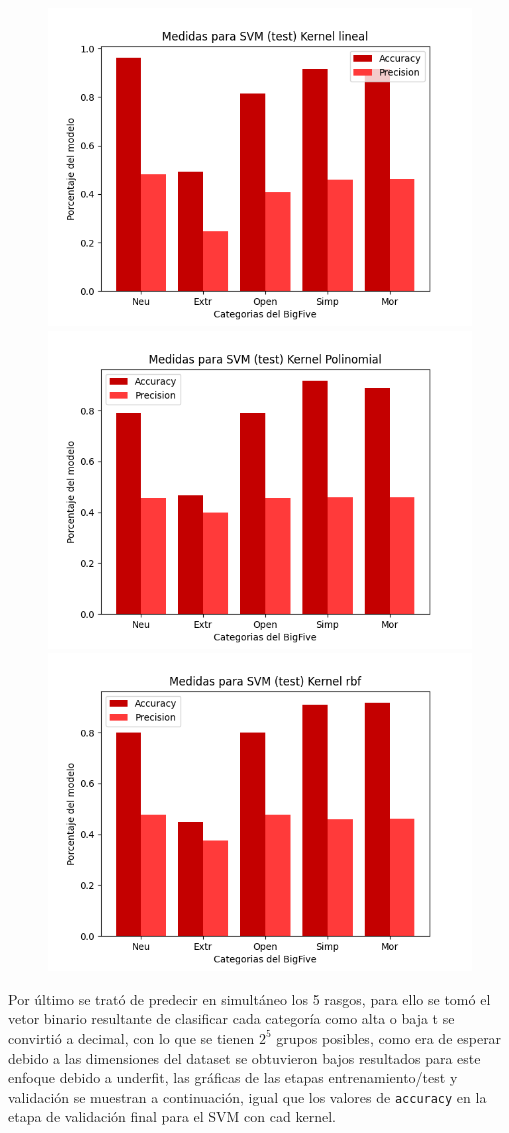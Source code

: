 \documentclass[10pt, a4paper]{article}
\begin{document}
          
            \begin{figure}[H]
                \centering
                \includegraphics[width = 0.3\linewidth]{final_lineal.png}
                \includegraphics[width = 0.3\linewidth]{final_polinomial.png}
                \includegraphics[width = 0.3\linewidth]{final_rbf.png}

            \end{figure}

            Por \'ultimo se trat\'o de predecir en simult\'aneo los 5 rasgos, para ello se tom\'o el vetor binario resultante de 
            clasificar cada categor\'ia como alta o baja t se convirti\'o a decimal, con lo que se tienen $2^5$ grupos posibles, como era de esperar 
            debido a las dimensiones del dataset se obtuvieron bajos resultados para este enfoque debido a underfit, las gr\'aficas de las etapas entrenamiento/test y 
            validaci\'on se muestran a continuaci\'on, igual que los valores de \texttt{accuracy} en la etapa de validaci\'on final para el SVM con cad kernel. 
\end{document}
